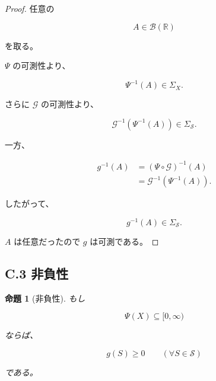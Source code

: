 \documentclass[a4paper,11pt]{article}
\newtheorem{proposition}[definition]{命題}
\newcommand{\Solver}{\mathcal{S}}
\newcommand{\R}{\mathbb{R}}
\newcommand{\Eval}{\mathcal{G}}
\newcommand{\EvalMap}{\Psi}
\begin{document}
\begin{proof}
任意の

\begin{equation}
    A\in\mathcal{B}(\R)
\end{equation}

を取る。

$\EvalMap$ の可測性より、

\begin{equation}
    \EvalMap^{-1}(A)\in\Sigma_X.
\end{equation}

さらに $\Eval$ の可測性より、

\begin{equation}
    \Eval^{-1}
    \left(
        \EvalMap^{-1}(A)
    \right)
    \in\Sigma_{\Solver}.
\end{equation}

一方、

\begin{align}
    g^{-1}(A)
    &=
    (\EvalMap\circ\Eval)^{-1}(A)
    \\
    &=
    \Eval^{-1}
    \left(
        \EvalMap^{-1}(A)
    \right).
\end{align}

したがって、

\begin{equation}
    g^{-1}(A)\in\Sigma_{\Solver}.
\end{equation}

$A$ は任意だったので $g$ は可測である。
\end{proof}


\subsection{C.3 非負性}

\begin{proposition}[非負性]
もし

\begin{equation}
    \EvalMap(X)\subseteq[0,\infty)
\end{equation}

ならば、

\begin{equation}
    g(S)\geq0
    \qquad
    (\forall S\in\Solver)
\end{equation}

である。
\end{proposition}
\end{document}
